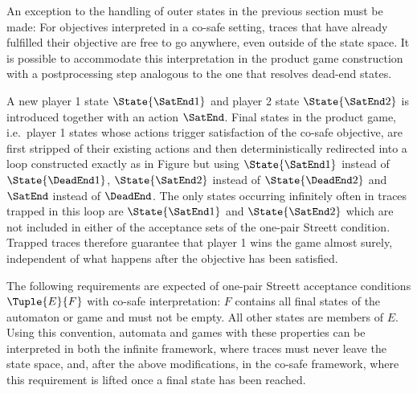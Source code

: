 \stopsubsection


\startsubsection[title={Co-Safe Interpretation},reference=sec:abstraction-product-cosafe]

    An exception to the handling of outer states in the previous section must be made:
    For objectives interpreted in a co-safe setting, traces that have already fulfilled their objective are free to go anywhere, even outside of the state space.
    It is possible to accommodate this interpretation in the product game construction with a postprocessing step analogous to the one that resolves dead-end states.

    A new player 1 state $\State{\SatEnd1}$ and player 2 state $\State{\SatEnd2}$ is introduced together with an action $\SatEnd$.
    Final states in the product game, i.e.\ player 1 states whose actions trigger satisfaction of the co-safe objective, are first stripped of their existing actions and then deterministically redirected into a loop constructed exactly as in Figure  but using $\State{\SatEnd1}$ instead of $\State{\DeadEnd1}$, $\State{\SatEnd2}$ instead of $\State{\DeadEnd2}$ and $\SatEnd$ instead of $\DeadEnd$.
    The only states occurring infinitely often in traces trapped in this loop are $\State{\SatEnd1}$ and $\State{\SatEnd2}$ which are not included in either of the acceptance sets of the one-pair Streett condition.
    Trapped traces therefore guarantee that player 1 wins the game almost surely, independent of what happens after the objective has been satisfied.

    The following requirements are expected of one-pair Streett acceptance conditions $\Tuple{E}{F}$ with co-safe interpretation:
    $F$ contains all final states of the automaton or game and must not be empty.
    All other states are members of $E$.
    Using this convention, automata and games with these properties can be interpreted in both the infinite framework, where traces must never leave the state space, and, after the above modifications, in the co-safe framework, where this requirement is lifted once a final state has been reached.

\stopsubsection

